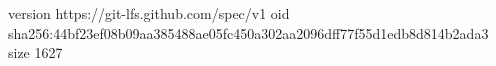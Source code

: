 version https://git-lfs.github.com/spec/v1
oid sha256:44bf23ef08b09aa385488ae05fc450a302aa2096dff77f55d1edb8d814b2ada3
size 1627
